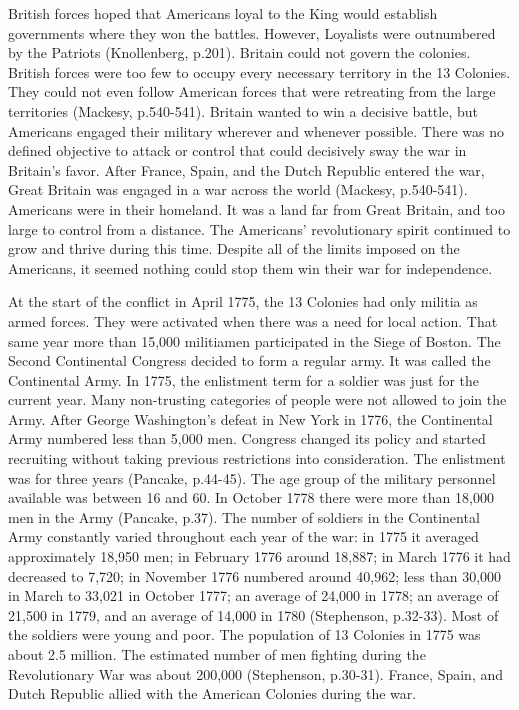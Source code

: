 British forces hoped that Americans loyal to the King would establish
governments where they won the battles. However, Loyalists were outnumbered by
the Patriots (Knollenberg, p.201).  Britain could not govern the colonies.
British forces were too few to occupy every necessary territory in the 13
Colonies.  They could not even follow American forces that were retreating from
the large territories (Mackesy, p.540-541).  Britain wanted to win a decisive
battle, but Americans engaged their military wherever and whenever possible.
There was no defined objective to attack or control that could decisively sway
the war in Britain’s favor.  After France, Spain, and the Dutch Republic entered
the war, Great Britain was engaged in a war across the world (Mackesy,
p.540-541).  Americans were in their homeland.  It was a land far from Great
Britain, and too large to control from a distance.   The Americans’
revolutionary spirit continued to grow and thrive during this time.  Despite all
of the limits imposed on the Americans, it seemed nothing could stop them win
their war for independence. 

At the start of the conflict in April 1775, the 13 Colonies had only militia as
armed forces.  They were activated when there was a need for local action.  That
same year more than 15,000 militiamen participated in the Siege of Boston.  The
Second Continental Congress decided to form a regular army.  It was called the
Continental Army.  In 1775, the enlistment term for a soldier was just for the
current year.  Many non-trusting categories of people were not allowed to join
the Army.  After George Washington’s defeat in New York in 1776, the Continental
Army numbered less than 5,000 men.  Congress changed its policy and started
recruiting without taking previous restrictions into consideration. The
enlistment was for three years (Pancake, p.44-45).  The age group of the
military personnel available was between 16 and 60.   In October 1778 there were
more than 18,000 men in the Army (Pancake, p.37).  The number of soldiers in the
Continental Army constantly varied throughout each year of the war:  in 1775  it
averaged approximately 18,950 men; in February 1776 around 18,887;  in March
1776 it had decreased to 7,720;  in November 1776 numbered around 40,962; less
than 30,000 in March to 33,021 in October 1777; an average of 24,000 in 1778; an
average of 21,500 in 1779, and an average of 14,000 in 1780 (Stephenson,
p.32-33).  Most of the soldiers were young and poor.  The population of 13
Colonies in 1775 was about 2.5 million.  The estimated number of men fighting
during the Revolutionary War was about 200,000 (Stephenson, p.30-31).  France,
Spain, and Dutch Republic allied with the American Colonies during the war.


